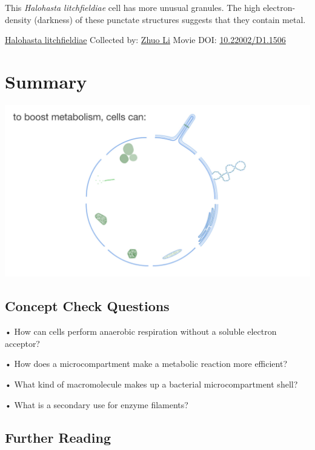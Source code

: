 \documentclass[]{tufte-book}
\begin{document}
This \emph{Halohasta litchfieldiae} cell has more unusual granules. The high electron-density (darkness) of these punctate structures suggests that they contain metal.



\hypertarget{htmlwidget-fdb12eec5ea5c985e307}{}

\label{fig:4-10b}\protect\hyperlink{tree}{Halohasta litchfieldiae} Collected by: \protect\hyperlink{zhuo_li}{Zhuo Li} Movie DOI: \href{https://doi.org/10.22002/D1.1506}{10.22002/D1.1506}

\hypertarget{summary-3}{%
\section{Summary}\label{summary-3}}

\includegraphics{img/summaries/04_Growth}

\hypertarget{concept-check-questions-3}{%
\subsection*{Concept Check Questions}\label{concept-check-questions-3}}

• How can cells perform anaerobic respiration without a soluble electron acceptor?

• How does a microcompartment make a metabolic reaction more efficient?

• What kind of macromolecule makes up a bacterial microcompartment shell?

• What is a secondary use for enzyme filaments?

\hypertarget{further-reading-3}{%
\subsection*{Further Reading}\label{further-reading-3}}
\end{document}
